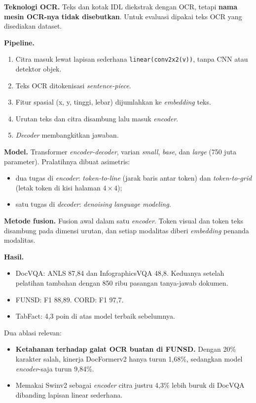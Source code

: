 \textbf{Teknologi OCR.} Teks dan kotak IDL diekstrak dengan OCR, tetapi \textbf{nama mesin
OCR-nya tidak disebutkan}. Untuk evaluasi dipakai teks OCR yang disediakan dataset.

\textbf{Pipeline.}
\begin{enumerate}
  \item Citra masuk lewat lapisan sederhana \texttt{linear(conv2x2(v))}, tanpa CNN atau
  detektor objek.
  \item Teks OCR ditokenisasi \textit{sentence-piece}.
  \item Fitur spasial (x, y, tinggi, lebar) dijumlahkan ke \textit{embedding} teks.
  \item Urutan teks dan citra disambung lalu masuk \textit{encoder}.
  \item \textit{Decoder} membangkitkan jawaban.
\end{enumerate}

\textbf{Model.} Transformer \textit{encoder-decoder}, varian \textit{small},
\textit{base}, dan \textit{large} (750 juta parameter). Pralatihnya dibuat asimetris:
\begin{itemize}
  \item dua tugas di \textit{encoder}: \textit{token-to-line} (jarak baris antar token) dan
  \textit{token-to-grid} (letak token di kisi halaman $4\times4$);
  \item satu tugas di \textit{decoder}: \textit{denoising language modeling}.
\end{itemize}

\textbf{Metode fusion.} Fusion awal dalam satu \textit{encoder}. Token visual dan token teks
disambung pada dimensi urutan, dan setiap modalitas diberi \textit{embedding} penanda
modalitas.

\textbf{Hasil.}
\begin{itemize}
  \item DocVQA: ANLS 87,84 dan InfographicsVQA 48,8. Keduanya setelah pelatihan tambahan
  dengan 850 ribu pasangan tanya-jawab dokumen.
  \item FUNSD: F1 88,89. CORD: F1 97,7.
  \item TabFact: 4,3 poin di atas model terbaik sebelumnya.
\end{itemize}

Dua ablasi relevan:
\begin{itemize}
  \item \textbf{Ketahanan terhadap galat OCR buatan di FUNSD.} Dengan 20\% karakter salah,
  kinerja DocFormerv2 hanya turun 1,68\%, sedangkan model \textit{encoder}-saja turun
  9,84\%.
  \item Memakai Swinv2 sebagai \textit{encoder} citra justru 4,3\% lebih buruk di DocVQA
  dibanding lapisan linear sederhana.
\end{itemize}

